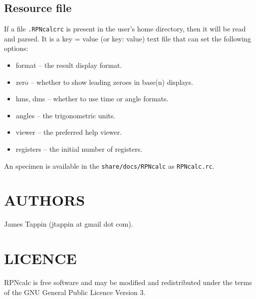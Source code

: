 \documentclass{article}
\begin{document}
\subsection{Resource file}

If a file \texttt{.RPNcalcrc} is present in the user's home
directory, then it will be read and parsed. It is a key = value (or
key: value) text file that can set the following options:
\begin{itemize}
\item format -- the result display format.
\item zero -- whether to show leading zeroes in base(n) displays.
\item hms, dms -- whether to use time or angle formats.
\item angles -- the trigonometric units.
\item viewer -- the preferred help viewer.
\item registers -- the initial number of registers.
\end{itemize}
An specimen is available in the \texttt{share/docs/RPNcalc} as
\texttt{RPNcalc.rc}. 

\section{AUTHORS}

James Tappin (jtappin at gmail dot com).

\section{LICENCE}

RPNcalc is free software and may be modified and redistributed under
the terms of the GNU General Public Licence Version 3.

\LatexManEnd
\end{document}
